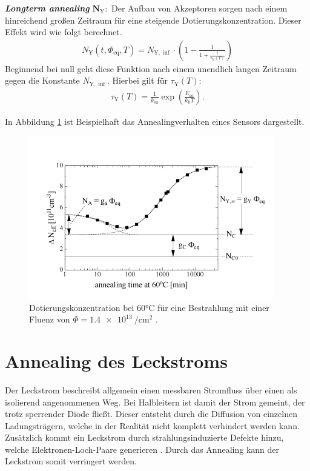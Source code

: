\textbf{\textit{Longterm annealing}} $\symbf{N_{\mathrm{Y}}}:$ Der Aufbau von
Akzeptoren sorgen nach einem hinreichend großen Zeitraum für eine steigende
Dotierungskonzentration. Dieser Effekt wird wie folgt berechnet.
\begin{align}
  N_{\mathrm{Y}}(t, \Phi_{\mathrm{eq}}, T)     = N_{\mathrm{Y , \inf}}\cdot \left(1 - \frac{1}{1 + \frac{t}{\tau_{\mathrm{Y}}(T)}}\right)
\end{align}
Beginnend bei null geht diese Funktion nach einem unendlich langen Zeitraum gegen die Konstante $N_{\mathrm{Y, \inf}}$.
Hierbei gilt für $\tau_{\mathrm{Y}}(T)$:
\begin{align}
  \tau_{\mathrm{Y}}(T) = \frac{1}{k_{0\mathrm{a}}}\exp{\left(\frac{E_{aa}}{k_{\mathrm{b}}T}\right)}.
\end{align}

In Abbildung \ref{fig:n_eff_beispiel} ist Beispielhaft das Annealingverhalten eines
Sensors dargestellt.

\begin{figure}
  \includegraphics[width=0.95\textwidth]{logos/n_eff_beispiel.PNG}
  \caption{Dotierungskonzentration bei 60°C für eine Bestrahlung mit einer Fluenz
  von $\Phi=\SI{1.4e13}{\per\centi\meter\squared}$ .\cite{moll}}
  \label{fig:n_eff_beispiel}
\end{figure}



\section{Annealing des Leckstroms}
Der Leckstrom beschreibt allgemein einen messbaren Stromfluss über einen als isolierend
angenommenen Weg. Bei Halbleitern ist damit der Strom gemeint, der trotz sperrender
Diode fließt. Dieser entsteht durch die Diffusion von einzelnen Ladungsträgern, welche
in der Realität nicht komplett verhindert werden kann.
Zusätzlich kommt ein Leckstrom durch strahlungsinduzierte Defekte hinzu, welche
Elektronen-Loch-Paare generieren \cite{moll}.
Durch das Annealing kann der Leckstrom somit verringert werden.

